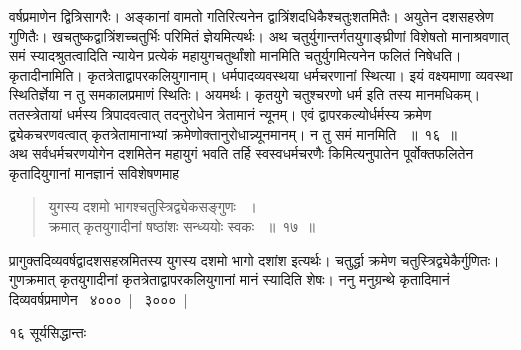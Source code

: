 \documentclass[11pt, openany]{book}
\begin{document}
वर्षप्रमाणेन द्वित्रिसागरैः। अङ्कानां वामतो गतिरित्यनेन द्वात्रिंशदधिकैश्चतुःशतमितैः। अयुतेन दशसहस्रेण गुणितैः। खचतुष्कद्वात्रिंशच्चतुर्भिः परिमितं ज्ञेयमित्यर्थः। अथ चतुर्युगान्तर्गतयुगाङ्घ्रीणां विशेषतो मानाश्रवणात् समं स्यादश्रुतत्वादिति न्यायेन प्रत्येकं महायुगचतुर्थांशो मानमिति चतुर्युगमित्यनेन फलितं निषेधति। कृतादीनामिति। कृतत्रेताद्वापरकलियुगानाम्। धर्मपादव्यवस्थया धर्मचरणानां स्थित्या। इयं वक्ष्यमाणा व्यवस्था स्थितिर्ज्ञेया न तु समकालप्रमाणं स्थितिः। अयमर्थः। कृतयुगे चतुश्चरणो धर्म इति तस्य मानमधिकम्। ततस्त्रेतायां धर्मस्य त्रिपादवत्वात् तदनुरोधेन त्रेतामानं न्यूनम्। एवं द्वापरकल्योर्धर्मस्य क्रमेण द्व्येकचरणवत्वात् कृतत्रेतामानाभ्यां क्रमेणोक्तानुरोधान्न्यूनमानम्। न तु समं मानमिति ~॥~१६~॥\\
\noindent अथ सर्वधर्मचरणयोगेन दशमितेन महायुगं भवति तर्हि स्वस्वधर्मचरणैः किमित्यनुपातेन पूर्वोक्तफलितेन कृतादियुगानां मानज्ञानं सविशेषणमाह\textendash


\begin{quote}
 {\ssi युगस्य दशमो भागश्चतुस्त्रिद्व्येकसङ्गुणः ~।\\
क्रमात् कृतयुगादीनां षष्ठांशः सन्ध्ययोः स्वकः ~॥~१७~॥}
\end{quote}
 प्रागुक्तदिव्यवर्षद्वादशसहस्रमितस्य युगस्य दशमो भागो दशांश इत्यर्थः। चतुर्द्धा क्रमेण चतुस्त्रिद्व्येकैर्गुणितः। गुणक्रमात् कृतयुगादीनां कृतत्रेताद्वापरकलियुगानां मानं स्यादिति शेषः। ननु मनुग्रन्थे कृतादिमानं दिव्यवर्षप्रमाणेन ~४०००~|~ ३०००~|

\newpage


\noindent १६ \hspace{4cm} सूर्यसिद्धान्तः 
\vspace{1cm}
\end{document}
